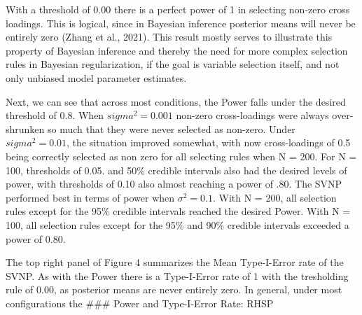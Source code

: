 \documentclass[
  man, donotrepeattitle,floatsintext]{apa6}
\begin{document}
With a threshold of 0.00 there is a perfect power of 1 in selecting non-zero cross loadings. This is logical, since in Bayesian inference posterior means will never be entirely zero (Zhang et al., 2021). This result mostly serves to illustrate this property of Bayesian inference and thereby the need for more complex selection rules in Bayesian regularization, if the goal is variable selection itself, and not only unbiased model parameter estimates.

Next, we can see that across most conditions, the Power falls under the desired threshold of 0.8. When \(sigma^2 = 0.001\) non-zero cross-loadings were always over-shrunken so much that they were never selected as non-zero. Under \(sigma^2 = 0.01\), the situation improved somewhat, with now cross-loadings of 0.5 being correctly selected as non zero for all selecting rules when N = 200. For N = 100, thresholds of 0.05. and 50\% credible intervals also had the desired levels of power, with thresholds of 0.10 also almost reaching a power of .80. The SVNP performed best in terms of power when \(\sigma^2 = 0.1\). With N = 200, all selection rules except for the 95\% credible intervals reached the desired Power. With N = 100, all selection rules except for the 95\% and 90\% credible intervals exceeded a power of 0.80.

The top right panel of Figure 4 summarizes the Mean Type-I-Error rate of the SVNP. As with the Power there is a Type-I-Error rate of 1 with the tresholding rule of 0.00, as posterior means are never entirely zero. In general, under most configurations the
\#\#\# Power and Type-I-Error Rate: RHSP
\end{document}
